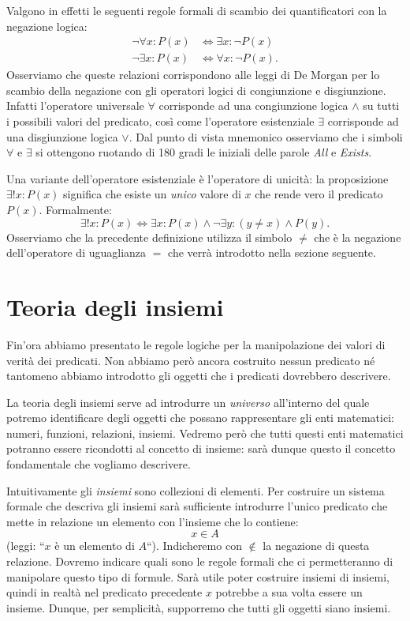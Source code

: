 \documentclass[italian,a4paper,hidelinks]{scrartcl}
\newcommand{\myemph}[1]{\emph{#1}\marginpar{#1}}
\begin{document}
Valgono in effetti le seguenti regole formali di scambio dei quantificatori con
la negazione logica:
\begin{align*}
  \neg \forall x \colon P(x) &\iff \exists x \colon \neg P(x)\\
  \neg \exists x \colon P(x) &\iff \forall x \colon \neg P(x).
\end{align*}
Osserviamo che queste relazioni corrispondono alle leggi di De Morgan per lo
scambio della negazione con gli operatori logici di congiunzione e disgiunzione.
Infatti l'operatore universale $\forall$ corrisponde ad una congiunzione logica
$\wedge$ su tutti i possibili valori del predicato,
così come l'operatore esistenziale
$\exists$ corrisponde ad una disgiunzione logica $\vee$.
Dal punto di vista mnemonico osserviamo che i simboli $\forall$ e $\exists$
si ottengono ruotando di 180 gradi le iniziali delle parole \emph{All} e \emph{Exists}.

Una variante dell'operatore esistenziale è l'operatore di unicità:
la proposizione $\exists! x\colon P(x)$ significa che esiste un \emph{unico} valore di $x$
che rende vero il predicato $P(x)$. Formalmente:
\[
  \exists!x\colon P(x) \iff \exists x\colon P(x)
  \wedge \neg \exists y\colon (y \neq x) \wedge P(y).
\]
Osserviamo che la precedente definizione utilizza il simbolo $\neq$ che è la
negazione dell'operatore di uguaglianza $=$ che verrà introdotto nella sezione
seguente.

\section{Teoria degli insiemi}

Fin'ora abbiamo presentato le regole logiche per la manipolazione dei valori di
verità dei predicati. Non abbiamo però ancora costruito nessun predicato né
tantomeno abbiamo introdotto gli oggetti che i predicati dovrebbero descrivere.

La teoria degli insiemi serve ad introdurre un \emph{universo} all'interno del
quale potremo identificare degli oggetti che possano rappresentare gli enti
matematici: numeri, funzioni, relazioni, insiemi.
Vedremo però che tutti questi enti matematici potranno essere ricondotti al
concetto di insieme: sarà dunque questo il concetto fondamentale che vogliamo
descrivere.

Intuitivamente gli \myemph{insiemi} sono collezioni di elementi.
Per costruire un sistema formale che descriva gli insiemi sarà sufficiente
introdurre l'unico predicato che mette in relazione un elemento con l'insieme
che lo contiene:
\[
  x \in A
\]
(leggi: ``$x$ è un elemento di $A$``).
Indicheremo con $\not \in$ la negazione
di questa relazione.
Dovremo indicare quali sono le regole formali che ci permetteranno di manipolare
questo tipo di formule.
Sarà utile poter costruire insiemi di insiemi, quindi in realtà nel predicato precedente
$x$ potrebbe a sua volta essere un insieme. Dunque, per semplicità, supporremo
che tutti gli oggetti siano insiemi.
\end{document}
